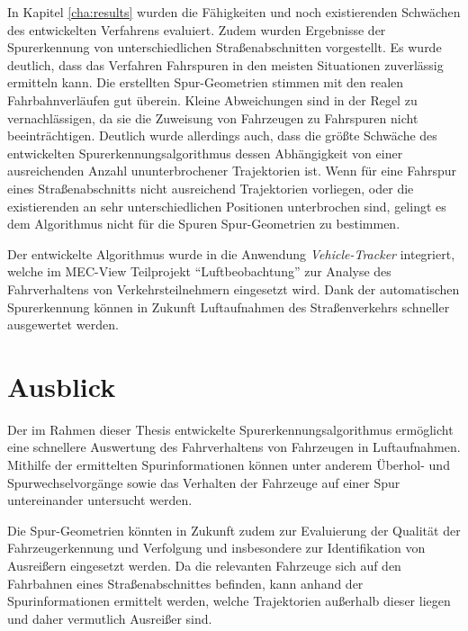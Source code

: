 In Kapitel \ref{cha:results} wurden die Fähigkeiten und noch existierenden Schwächen des entwickelten
Verfahrens evaluiert. Zudem wurden Ergebnisse der Spurerkennung von unterschiedlichen Straßenabschnitten
vorgestellt. Es wurde deutlich, dass das Verfahren Fahrspuren in den meisten Situationen zuverlässig
ermitteln kann. Die erstellten Spur-Geometrien stimmen mit den realen Fahrbahnverläufen gut überein.
Kleine Abweichungen sind in der Regel zu vernachlässigen, da sie die Zuweisung von Fahrzeugen zu Fahrspuren
nicht beeinträchtigen.
Deutlich wurde allerdings auch, dass die größte Schwäche des entwickelten Spurerkennungsalgorithmus
dessen Abhängigkeit von einer ausreichenden Anzahl ununterbrochener Trajektorien ist. Wenn für eine
Fahrspur eines Straßenabschnitts nicht ausreichend Trajektorien vorliegen, oder die existierenden an sehr
unterschiedlichen Positionen unterbrochen sind, gelingt es dem Algorithmus nicht für die Spuren
Spur-Geometrien zu bestimmen.

Der entwickelte Algorithmus wurde in die Anwendung \textit{Vehicle-Tracker} integriert,
welche im MEC-View Teilprojekt ``Luftbeobachtung'' zur Analyse des Fahrverhaltens von Verkehrsteilnehmern
eingesetzt wird. Dank der automatischen Spurerkennung können in Zukunft Luftaufnahmen des Straßenverkehrs
schneller ausgewertet werden.

\section{Ausblick}

Der im Rahmen dieser Thesis entwickelte Spurerkennungsalgorithmus ermöglicht eine schnellere Auswertung
des Fahrverhaltens von Fahrzeugen in Luftaufnahmen. Mithilfe der ermittelten Spurinformationen können
unter anderem Überhol- und Spurwechselvorgänge sowie das Verhalten der Fahrzeuge auf einer Spur
untereinander untersucht werden.

Die Spur-Geometrien könnten in Zukunft zudem zur Evaluierung der Qualität der Fahrzeugerkennung und Verfolgung
und insbesondere zur Identifikation von Ausreißern eingesetzt werden. Da die relevanten Fahrzeuge sich
auf den Fahrbahnen eines Straßenabschnittes befinden, kann anhand der Spurinformationen ermittelt werden, 
welche Trajektorien außerhalb dieser liegen und daher vermutlich Ausreißer sind.

